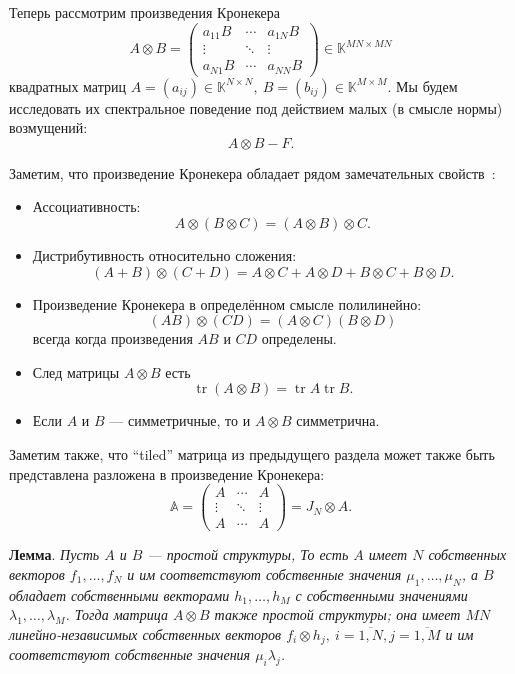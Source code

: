 Теперь рассмотрим произведения Кронекера
\[
    A\otimes B =
    \begin{pmatrix}
        a_{11} B & \cdots & a_{1N} B \\
        \vdots   & \ddots & \vdots \\
        a_{N1} B & \cdots & a_{NN} B
    \end{pmatrix}
    \in \mathbb{K}^{{MN}{\times}{MN}}
\]
    квадратных матриц
\( A={(a_{ij})}\in\mathbb{K}^{N{\times}N},
 \ B={(b_{ij})}\in\mathbb{K}^{M{\times}M}. \)
Мы будем исследовать их спектральное поведение
    под действием малых (в смысле нормы) возмущений:
\begin{equation}\label{nkjpcs-kronperturb}
    A\otimes B - F.
\end{equation}

Заметим, что произведение Кронекера обладает рядом замечательных свойств~\cite{bellman-matrices-kron}:
\begin{itemize}
\item Ассоциативность:
    \[ A\otimes (B\otimes C) = (A\otimes B)\otimes C. \]
\item Дистрибутивность относительно сложения:
    \[ (A+B)\otimes(C+D) = A\otimes C + A\otimes D + B\otimes C + B\otimes D. \]
\item Произведение Кронекера в определённом смысле полилинейно:
    \[ (AB)\otimes(CD) = (A\otimes C)(B\otimes D) \]
    всегда когда произведения \( AB \) и \( CD \) определены.
\item След матрицы \( A\otimes B \) есть \[ \operatorname{tr}(A\otimes B) = \operatorname{tr}A\operatorname{tr}B. \]
\item Если \( A \) и \( B \) --- симметричные,
      то и \( A\otimes B \) симметрична.
\end{itemize}
Заметим также, что ``tiled'' матрица из предыдущего раздела
    может также быть представлена разложена в произведение Кронекера:
\[
    \mathbb{A} =
    \begin{pmatrix}
    A & \cdots & A\\
    \vdots & \ddots & \vdots \\
    A & \cdots & A\end{pmatrix} =
        J_N\otimes A.
    \]

\begingroup
\textbf{Лемма}.
\itshape
Пусть \( A \) и \( B \) --- простой структуры,
    То есть \( A \) имеет \( N \) собственных векторов
    \( f_1, \ldots, f_N \)
    и им соответствуют собственные значения \( \mu_1, \ldots, \mu_N \),
    а \( B \) обладает собственными векторами \( h_1, \ldots, h_M \)
    с собственными значениями \( \lambda_1, \ldots, \lambda_M \).
Тогда матрица \( A\otimes B \) также простой структуры;
    она имеет \( MN \) линейно-независимых собственных векторов
    \( f_i\otimes h_j,\ i{=}\overline{1,N}, j{=}\overline{1,M} \)
    и им соответствуют собственные значения \( \mu_i \lambda_j \).
\endgroup


